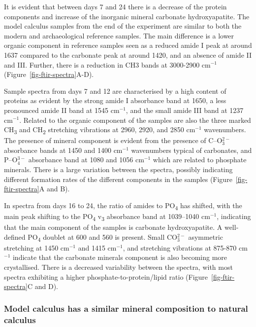 \documentclass[10pt,a4paper]{article}
\begin{document}
It is evident that between days 7 and 24 there is a decrease of the
protein components and increase of the inorganic mineral carbonate
hydroxyapatite. The model calculus samples from the end of the
experiment are similar to both the modern and archaeological reference
samples. The main difference is a lower organic component in reference
samples seen as a reduced amide I peak at around 1637 compared to the
carbonate peak at around 1420, and an absence of amide II and III.
Further, there is a reduction in CH3 bands at 3000-2900 cm\(^{-1}\)
(Figure~\ref{fig-ftir-spectra}A-D).

Sample spectra from days 7 and 12 are characterised by a high content of
proteins as evident by the strong amide I absorbance band at 1650, a
less pronounced amide II band at 1545 cm\(^{-1}\), and the small amide
III band at 1237 cm\(^{-1}\). Related to the organic component of the
samples are also the three marked CH\textsubscript{3} and
CH\textsubscript{2} stretching vibrations at 2960, 2920, and 2850
cm\(^{-1}\) wavenumbers. The presence of mineral component is evident
from the presence of C--O\(^{2-}_3\) absorbance bands at 1450 and 1400
cm\(^{-1}\) wavenumbers typical of carbonates, and P--O\(^{3-}_4\)
absorbance band at 1080 and 1056 cm\(^{-1}\) which are related to
phosphate minerals. There is a large variation between the spectra,
possibly indicating different formation rates of the different
components in the samples (Figure~\ref{fig-ftir-spectra}A and B).

In spectra from days 16 to 24, the ratio of amides to
PO\textsubscript{4} has shifted, with the main peak shifting to the
PO\textsubscript{4} v\textsubscript{3} absorbance band at 1039--1040
cm\(^{-1}\), indicating that the main component of the samples is
carbonate hydroxyapatite. A well-defined PO\textsubscript{4} doublet at
600 and 560 is present. Small CO\(_3^{2-}\) asymmetric stretching at
1450 cm\(^{-1}\) and 1415 cm\(^{-1}\), and stretching vibrations at
875-870 cm\(^{-1}\) indicate that the carbonate minerals component is
also becoming more crystallised. There is a decreased variability
between the spectra, with most spectra exhibiting a higher
phosphate-to-protein/lipid ratio (Figure~\ref{fig-ftir-spectra}C and D).

\subsubsection{Model calculus has a similar mineral composition to
natural
calculus}\label{model-calculus-has-a-similar-mineral-composition-to-natural-calculus}
\end{document}
